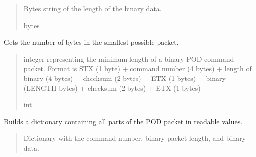 \documentclass[letterpaper,10pt,english]{sphinxmanual}
\begin{document}
\begin{fulllineitems}
\begin{fulllineitems}
\begin{quote}
\begin{description}
\sphinxAtStartPar
Bytes string of the length of the binary data.

\sphinxAtStartPar
bytes

\end{description}\end{quote}

\end{fulllineitems}


\begin{fulllineitems}
\label{\detokenize{PodApi.Packets:PodApi.Packets.Binary.PacketBinary.GetMinimumLength}}
\pysigstartsignatures
{}
\pysigstopsignatures
\sphinxAtStartPar
Gets the number of bytes in the smallest possible packet.
\begin{quote}\begin{description}
\sphinxAtStartPar
integer representing the minimum length of a binary POD                 command packet. Format is STX (1 byte) + command number (4 bytes) + length                 of binary (4 bytes) + checksum (2 bytes) + ETX (1 bytes) + binary (LENGTH                 bytes) + checksum (2 bytes) + ETX (1 bytes)

\sphinxAtStartPar
int

\end{description}\end{quote}

\end{fulllineitems}


\begin{fulllineitems}
\label{\detokenize{PodApi.Packets:PodApi.Packets.Binary.PacketBinary.TranslateAll}}
\pysigstartsignatures
{}
\pysigstopsignatures
\sphinxAtStartPar
Builds a dictionary containing all parts of the POD packet in readable values.
\begin{quote}\begin{description}
\sphinxAtStartPar
Dictionary with the command number, binary packet length,                 and binary data.


\end{description}
\end{quote}
\end{fulllineitems}
\end{fulllineitems}
\end{document}
